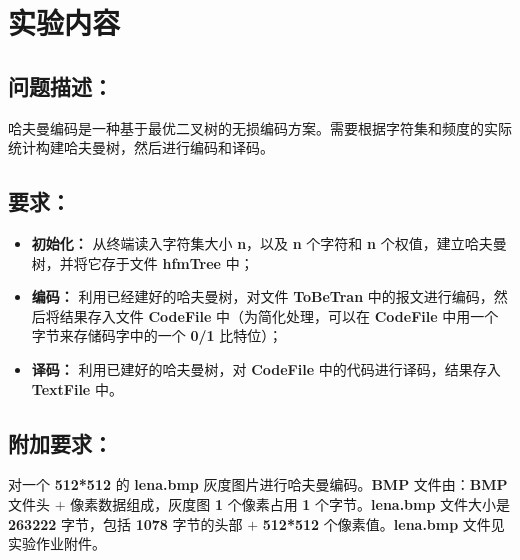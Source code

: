 \section{实验内容}
    \subsection{问题描述：}
        \par 哈夫曼编码是一种基于最优二叉树的无损编码方案。需要根据字符集和频度的实际统计构建哈夫曼树，然后进行编码和译码。
    \subsection{要求：}
        \begin{itemize}
            \item \textbf{初始化：} 从终端读入字符集大小 \textbf{n}，以及 \textbf{n} 个字符和 \textbf{n} 个权值，建立哈夫曼树，并将它存于文件 \textbf{hfmTree} 中；
            \item \textbf{编码：} 利用已经建好的哈夫曼树，对文件 \textbf{ToBeTran} 中的报文进行编码，然后将结果存入文件 \textbf{CodeFile} 中（为简化处理，可以在 \textbf{CodeFile} 中用一个字节来存储码字中的一个 \textbf{0/1} 比特位）；
            \item \textbf{译码：} 利用已建好的哈夫曼树，对 \textbf{CodeFile} 中的代码进行译码，结果存入 \textbf{TextFile} 中。
        \end{itemize}
    \subsection{附加要求：}
        \par 对一个 \textbf{512*512} 的 \textbf{lena.bmp} 灰度图片进行哈夫曼编码。\textbf{BMP} 文件由：\textbf{BMP} 文件头 $+$ 像素数据组成，灰度图 \textbf{1} 个像素占用 \textbf{1} 个字节。\textbf{lena.bmp} 文件大小是 \textbf{263222} 字节，包括 \textbf{1078} 字节的头部 $+$ \textbf{512*512} 个像素值。\textbf{lena.bmp} 文件见实验作业附件。
        